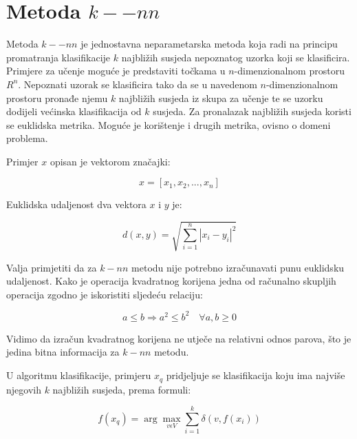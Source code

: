 \documentclass{ru}
\begin{document}
\section{Metoda $k--nn$}


Metoda $k--nn$ je jednostavna neparametarska metoda koja radi na principu
promatranja klasifikacije $k$ najbližih susjeda nepoznatog uzorka koji se
klasificira. Primjere za učenje moguće je predstaviti točkama u
$n$-dimenzionalnom prostoru $R^{n}$. Nepoznati uzorak se klasificira tako da
se u navedenom $n$-dimenzionalnom prostoru pronađe njemu $k$ najbližih susjeda
iz skupa za učenje te se uzorku dodijeli većinska klasifikacija od $k$ susjeda.
Za pronalazak najbližih susjeda koristi se euklidska metrika. Moguće je
korištenje i drugih metrika, ovisno o domeni problema.

Primjer $x$ opisan je vektorom značajki:

\begin{equation}
x = [x_1, x_2, ..., x_n]
\end{equation}

Euklidska udaljenost dva vektora $x$ i $y$ je:

\begin{equation}
d(x, y) = \sqrt{\sum_{i=1}^n |x_i - y_i|^2}
\end{equation}

Valja primjetiti da za $k-nn$ metodu nije potrebno izračunavati punu euklidsku
udaljenost. Kako je operacija kvadratnog korijena jedna od računalno skupljih
operacija zgodno je iskoristiti sljedeću relaciju:

\begin{equation}
a \leq b \Rightarrow a^2 \leq b^2 \quad \forall a,b \geq 0
\end{equation}

Vidimo da izračun kvadratnog korijena ne utječe na relativni odnos parova, što
je jedina bitna informacija za $k-nn$ metodu.

U algoritmu klasifikacije, primjeru $x_q$ pridjeljuje se klasifikacija koju ima najviše njegovih $k$ najbližih
susjeda, prema formuli:

\begin{equation}
f(x_q)=\arg\max_{v \epsilon V} \sum_{i=1}^k \delta(v,f(x_i))
\end{equation}
\end{document}
